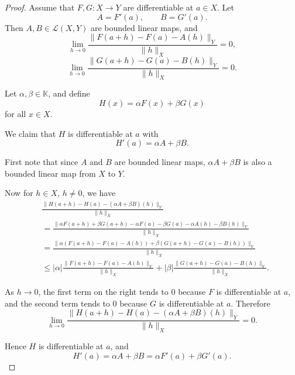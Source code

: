 \begin{proof}
    Assume that $F,G : X \to Y$ are differentiable at $a \in X$.
    Let
    \[
        A = F'(a), \qquad B = G'(a).
    \]
    Then $A,B \in \mathcal L(X,Y)$ are bounded linear maps, and
    \[
        \lim_{h\to 0}
        \frac{\|F(a+h)-F(a)-A(h)\|_Y}{\|h\|_X}=0,
    \]
    \[
        \lim_{h\to 0}
        \frac{\|G(a+h)-G(a)-B(h)\|_Y}{\|h\|_X}=0.
    \]

    Let $\alpha,\beta \in \mathbb K$, and define
    \[
        H(x)=\alpha F(x)+\beta G(x)
    \]
    for all $x\in X$.

    We claim that $H$ is differentiable at $a$ with
    \[
        H'(a)=\alpha A+\beta B.
    \]

    First note that since $A$ and $B$ are bounded linear maps,
    $\alpha A+\beta B$ is also a bounded linear map from $X$ to $Y$.

    Now for $h\in X$, $h\neq 0$, we have
    \begin{align*}
        &\frac{\|H(a+h)-H(a)-(\alpha A+\beta B)(h)\|_Y}{\|h\|_X} \\
        &= \frac{\|\alpha F(a+h)+\beta G(a+h)-\alpha F(a)-\beta 
        G(a)-\alpha A(h)-\beta B(h)\|_Y}{\|h\|_X} \\
        &= \frac{\|\alpha(F(a+h)-F(a)-A(h))+
        \beta(G(a+h)-G(a)-B(h))\|_Y}{\|h\|_X} \\
        &\leq
        |\alpha|\frac{\|F(a+h)-F(a)-A(h)\|_Y}{\|h\|_X}
        +
        |\beta|\frac{\|G(a+h)-G(a)-B(h)\|_Y}{\|h\|_X}.
    \end{align*}

    As $h\to 0$, the first term on the right tends to $0$ because
    $F$ is differentiable at $a$, and the second term tends to $0$
    because $G$ is differentiable at $a$. Therefore
    \[
        \lim_{h\to 0}
        \frac{\|H(a+h)-H(a)-(\alpha A+\beta B)(h)\|_Y}{\|h\|_X}=0.
    \]

    Hence $H$ is differentiable at $a$, and
    \[
        H'(a)=\alpha A+\beta B
        = \alpha F'(a)+\beta G'(a).
    \]
\end{proof}

